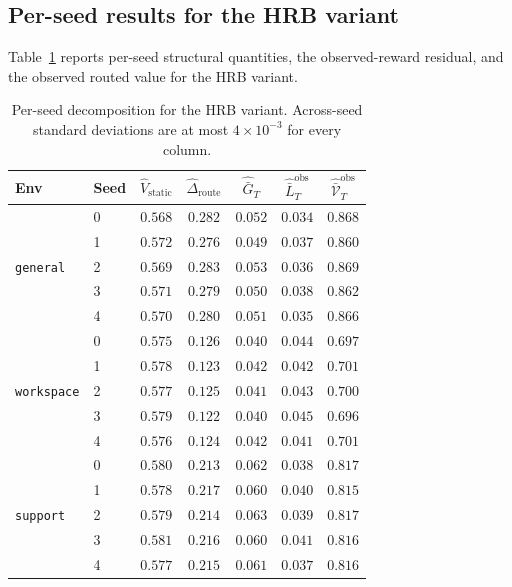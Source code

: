 \documentclass{article} %
\begin{document}
\subsection{Per-seed results for the \textnormal{HRB} variant}

\label{app:tab-perseed}

Table~\ref{tab:app-perseed} reports per-seed structural quantities, the
observed-reward residual, and the observed routed value for the
\textnormal{HRB} variant.

\begin{table}[h]
\centering
\small
\setlength{\tabcolsep}{4pt}
\caption{Per-seed decomposition for the \textnormal{HRB} variant. Across-seed standard deviations are at most $4\times 10^{-3}$ for every column.}
\label{tab:app-perseed}
\begin{tabular}{llccccc}
\toprule
Env & Seed & $\widehat V_{\mathrm{static}}$ & $\widehat\Delta_{\mathrm{route}}$ & $\widehat{\bar G}_T$ & $\widehat{\bar L}_T^{\mathrm{obs}}$ & $\widehat{\bar{\mathcal V}}_T^{\mathrm{obs}}$ \\
\midrule
\multirow{5}{*}{\texttt{general}}
 & 0 & $0.568$ & $0.282$ & $0.052$ & $0.034$ & $0.868$ \\
 & 1 & $0.572$ & $0.276$ & $0.049$ & $0.037$ & $0.860$ \\
 & 2 & $0.569$ & $0.283$ & $0.053$ & $0.036$ & $0.869$ \\
 & 3 & $0.571$ & $0.279$ & $0.050$ & $0.038$ & $0.862$ \\
 & 4 & $0.570$ & $0.280$ & $0.051$ & $0.035$ & $0.866$ \\
\midrule
\multirow{5}{*}{\texttt{workspace}}
 & 0 & $0.575$ & $0.126$ & $0.040$ & $0.044$ & $0.697$ \\
 & 1 & $0.578$ & $0.123$ & $0.042$ & $0.042$ & $0.701$ \\
 & 2 & $0.577$ & $0.125$ & $0.041$ & $0.043$ & $0.700$ \\
 & 3 & $0.579$ & $0.122$ & $0.040$ & $0.045$ & $0.696$ \\
 & 4 & $0.576$ & $0.124$ & $0.042$ & $0.041$ & $0.701$ \\
\midrule
\multirow{5}{*}{\texttt{support}}
 & 0 & $0.580$ & $0.213$ & $0.062$ & $0.038$ & $0.817$ \\
 & 1 & $0.578$ & $0.217$ & $0.060$ & $0.040$ & $0.815$ \\
 & 2 & $0.579$ & $0.214$ & $0.063$ & $0.039$ & $0.817$ \\
 & 3 & $0.581$ & $0.216$ & $0.060$ & $0.041$ & $0.816$ \\
 & 4 & $0.577$ & $0.215$ & $0.061$ & $0.037$ & $0.816$ \\
\bottomrule
\end{tabular}

\end{table}
\end{document}

